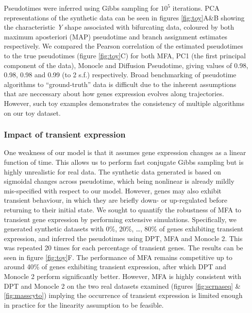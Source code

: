 Pseudotimes were inferred using Gibbs sampling for $10^5$ iterations. PCA representations of the synthetic data can be seen in figures \ref{fig:toy}A\&B showing the characteristic \emph{Y} shape associated with bifurcating data, coloured by both maximum aposteriori (MAP) pseudotime and branch assignment estimates respectively. We compared the Pearson correlation of the estimated pseudotimes to the true pseudotimes (figure \ref{fig:toy}C) for both MFA, PC1 (the first principal component of the data), Monocle and Diffusion Pseudotime, giving values of 0.98, 0.98, 0.98 and 0.99 (to 2 s.f.) respectively. Broad benchmarking of pseudotime algorithms to ``ground-truth'' data is difficult due to the inherent assumptions that are neccessary about how genes expression evolves along trajectories. However, such toy examples demonstrates the consistency of multiple algorithms on our toy dataset.

\subsubsection{Impact of transient expression}

One weakness of our model is that it assumes gene expression changes as a linear function of time. This allows us to perform fast conjugate Gibbs sampling but is highly unrealistic for real data.
The synthetic data generated is based on sigmoidal changes across pseudotime, which being nonlinear is already mildly mis-specified with respect to our model.
However, genes may also exhibit transient behaviour, in which they are briefly down- or up-regulated before returning to their initial state. We sought to quantify the robustness of MFA to transient gene expression by performing extensive simulations. Specifically, we generated synthetic datasets with 0\%, 20\%, \ldots, 80\% of genes exhibiting transient expression, and inferred the pseudotimes using DPT, MFA and Monocle 2. This was repeated 20 times for each percentage of transient genes. The results can be seen in figure \ref{fig:toy}F. The performance of MFA remains competitive up to around 40\% of genes exhibiting transient expression, after which DPT and Monocle 2 perform significantly better. However, MFA is highly consistent with DPT and Monocle 2 on the two real datasets examined (figures \ref{fig:scrnaseq} \& \ref{fig:masscyto}) implying the occurrence of transient expression is limited enough in practice for the linearity assumption to be feasible.

